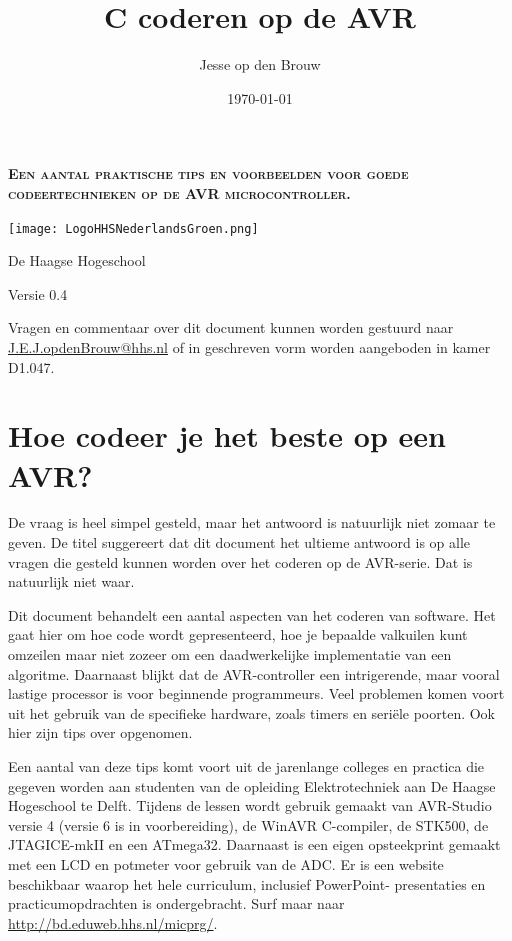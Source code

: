 \documentclass[12pt,a4paper,final,oneside,fleqn]{article}
\makeatletter
\def\maketitle{%
  \null
  \thispagestyle{empty}%
  \vfill
  \begin{center}\leavevmode
    {\fontfamily{phv}\fontsize{30pt}{36pt}\selectfont\bfseries\scshape \@title\par}%
    \vskip 1.0cm
    {\fontfamily{phv}\fontsize{13pt}{16pt}\selectfont\bfseries\scshape \subtitle\par}%
    \vskip 8.0cm
    \begin{minipage}[c]{.50\linewidth}
       \texttt{[image: LogoHHSNederlandsGroen.png]}
    \end{minipage}\hfill
    \begin{minipage}[c]{0.40\linewidth}
       {\hfill \large \@author\par}%
       \vskip 0.03cm
       {\hfill \large De Haagse Hogeschool\par}%
       \vskip 0.03cm
       {\hfill \large \@date\par}%
       \vskip 0.03cm
       {\hfill \large Versie \version\par}%
  \end{minipage}
  \end{center}%
  \vfill
  \null
  }
\makeatother
\begin{document}
\author{Jesse op den Brouw}
\title{C coderen op de AVR}
\newcommand{\subtitle}{Een aantal praktische tips en voorbeelden voor goede codeertechnieken op de AVR microcontroller.}
\date{\today}
\newcommand{\version}{0.4}

\maketitle

\newpage
\tableofcontents
\vfill
\noindent
\begin{center}
Vragen en commentaar over dit document kunnen worden gestuurd naar
\href{mailto:J.E.J.opdenBrouw@hhs.nl}{J.E.J.opdenBrouw@hhs.nl} of in
geschreven vorm worden aangeboden in kamer D1.047.
\end{center}

\newpage
\lstlistoflistings

\setcounter{section}{-1}
\newpage
\thispagestyle{fancy}
\section{Hoe codeer je het beste op een AVR?}
De vraag is heel simpel gesteld, maar het antwoord is natuurlijk niet
zomaar te geven.
De titel suggereert dat dit document het ultieme antwoord is op
alle vragen die gesteld kunnen worden over het coderen op de AVR-serie.
Dat is natuurlijk niet waar. 

Dit document behandelt een aantal aspecten van het coderen van software.
Het gaat hier om hoe code wordt gepresenteerd, hoe je bepaalde valkuilen
kunt omzeilen maar niet zozeer om een daadwerkelijke implementatie van een
algoritme. Daarnaast blijkt dat de AVR-controller een intrigerende, maar
vooral lastige processor is voor beginnende programmeurs. Veel problemen
komen voort uit het gebruik van de specifieke hardware, zoals timers en
seri\"{e}le poorten. Ook hier zijn tips over opgenomen.

Een aantal van deze tips komt voort uit de jarenlange colleges en practica
die gegeven worden aan studenten van de opleiding Elektrotechniek aan De
Haagse Hogeschool te Delft. Tijdens de lessen wordt gebruik gemaakt van
AVR-Studio versie 4 (versie 6 is in voorbereiding), de WinAVR C-compiler,
de STK500, de JTAGICE-mkII en een ATmega32. Daarnaast is een eigen
opsteekprint gemaakt met een LCD en potmeter voor gebruik van de ADC. Er is
een website beschikbaar waarop het hele curriculum, inclusief PowerPoint-
presentaties en practicumopdrachten is ondergebracht. Surf maar naar
\url{http://bd.eduweb.hhs.nl/micprg/}.
\end{document}
